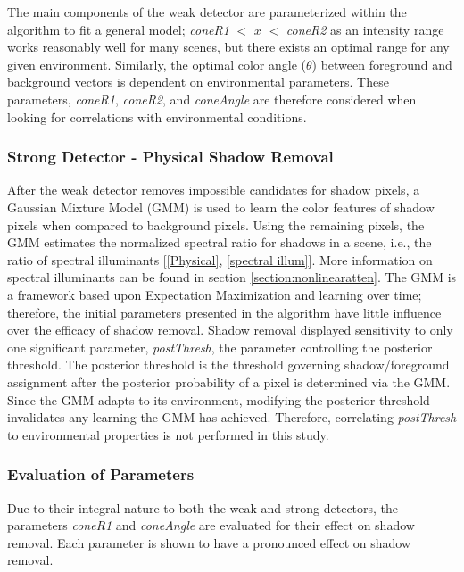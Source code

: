 The main components of the weak detector are parameterized within the algorithm to fit a general model; \textit{coneR1} $<$ $x$ $<$ \textit{coneR2} as an intensity range works reasonably well for many scenes, but there exists an optimal range for any given environment. Similarly, the optimal color angle ($\theta$) between foreground and background vectors is dependent on environmental parameters. These parameters, \textit{coneR1}, \textit{coneR2}, and \textit{coneAngle} are therefore considered when looking for correlations with environmental conditions.

\FloatBarrier
\subsubsection{Strong Detector - Physical Shadow Removal}

After the weak detector removes impossible candidates for shadow pixels, a Gaussian Mixture Model (GMM) is used to learn the color features of shadow pixels when compared to background pixels. Using the remaining pixels, the GMM estimates the normalized spectral ratio for shadows in a scene, i.e., the ratio of spectral illuminants [\ref{Physical}, \ref{spectral illum}]. More information on spectral illuminants can be found in section \ref{section:nonlinearatten}. The GMM is a framework based upon Expectation Maximization and learning over time; therefore, the initial parameters presented in the algorithm have little influence over the efficacy of shadow removal. Shadow removal displayed sensitivity to only one significant parameter, \textit{postThresh}, the parameter controlling the posterior threshold. The posterior threshold is the threshold governing shadow/foreground assignment after the posterior probability of a pixel is determined via the GMM. Since the GMM adapts to its environment, modifying the posterior threshold invalidates any learning the GMM has achieved. Therefore, correlating \textit{postThresh} to environmental properties is not performed in this study.

\subsubsection{Evaluation of Parameters}

Due to their integral nature to both the weak and strong detectors, the parameters \textit{coneR1} and \textit{coneAngle} are evaluated for their effect on shadow removal. Each parameter is shown to have a pronounced effect on shadow removal. 

